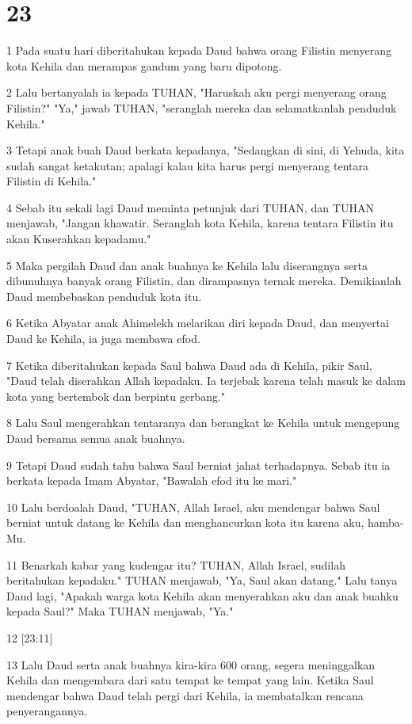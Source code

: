 \chapter{23}

\par 1 Pada suatu hari diberitahukan kepada Daud bahwa orang Filistin menyerang kota Kehila dan merampas gandum yang baru dipotong.
\par 2 Lalu bertanyalah ia kepada TUHAN, "Haruskah aku pergi menyerang orang Filistin?" "Ya," jawab TUHAN, "seranglah mereka dan selamatkanlah penduduk Kehila."
\par 3 Tetapi anak buah Daud berkata kepadanya, "Sedangkan di sini, di Yehuda, kita sudah sangat ketakutan; apalagi kalau kita harus pergi menyerang tentara Filistin di Kehila."
\par 4 Sebab itu sekali lagi Daud meminta petunjuk dari TUHAN, dan TUHAN menjawab, "Jangan khawatir. Seranglah kota Kehila, karena tentara Filistin itu akan Kuserahkan kepadamu."
\par 5 Maka pergilah Daud dan anak buahnya ke Kehila lalu diserangnya serta dibunuhnya banyak orang Filistin, dan dirampasnya ternak mereka. Demikianlah Daud membebaskan penduduk kota itu.
\par 6 Ketika Abyatar anak Ahimelekh melarikan diri kepada Daud, dan menyertai Daud ke Kehila, ia juga membawa efod.
\par 7 Ketika diberitahukan kepada Saul bahwa Daud ada di Kehila, pikir Saul, "Daud telah diserahkan Allah kepadaku. Ia terjebak karena telah masuk ke dalam kota yang bertembok dan berpintu gerbang."
\par 8 Lalu Saul mengerahkan tentaranya dan berangkat ke Kehila untuk mengepung Daud bersama semua anak buahnya.
\par 9 Tetapi Daud sudah tahu bahwa Saul berniat jahat terhadapnya. Sebab itu ia berkata kepada Imam Abyatar, "Bawalah efod itu ke mari."
\par 10 Lalu berdoalah Daud, "TUHAN, Allah Israel, aku mendengar bahwa Saul berniat untuk datang ke Kehila dan menghancurkan kota itu karena aku, hamba-Mu.
\par 11 Benarkah kabar yang kudengar itu? TUHAN, Allah Israel, sudilah beritahukan kepadaku." TUHAN menjawab, "Ya, Saul akan datang." Lalu tanya Daud lagi, "Apakah warga kota Kehila akan menyerahkan aku dan anak buahku kepada Saul?" Maka TUHAN menjawab, "Ya."
\par 12 [23:11]
\par 13 Lalu Daud serta anak buahnya kira-kira 600 orang, segera meninggalkan Kehila dan mengembara dari satu tempat ke tempat yang lain. Ketika Saul mendengar bahwa Daud telah pergi dari Kehila, ia membatalkan rencana penyerangannya.
